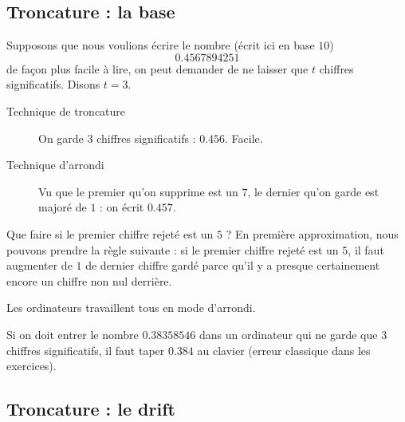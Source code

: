 \subsection{Troncature : la base}

Supposons que nous voulions écrire le nombre (écrit ici en base \( 10\))
\begin{equation}
	0.4567894251
\end{equation}
de façon plus facile à lire, on peut demander de ne laisser que \( t\) chiffres significatifs. Disons \( t=3\).

\begin{description}
	\item[Technique de troncature] On garde \( 3\) chiffres significatifs : \( 0.456\). Facile.
	\item[Technique d'arrondi] Vu que le premier qu'on supprime est un \( 7\), le dernier qu'on garde est majoré de \( 1\) : on écrit \( 0.457\).
\end{description}

Que faire si le premier chiffre rejeté est un \( 5\) ? En première approximation, nous pouvons prendre la règle suivante : si le premier chiffre rejeté est un \( 5\), il faut augmenter de \( 1\) de dernier chiffre gardé parce qu'il y a presque certainement encore un chiffre non nul derrière.

\begin{remark}
	Les ordinateurs travaillent tous en mode d'arrondi.
\end{remark}

\begin{example}
	Si on doit entrer le nombre \( 0.38358546\) dans un ordinateur qui ne garde que \( 3\) chiffres significatifs, il faut taper \( 0.384\) au clavier (erreur classique dans les exercices).
\end{example}

\subsection{Troncature : le drift}

